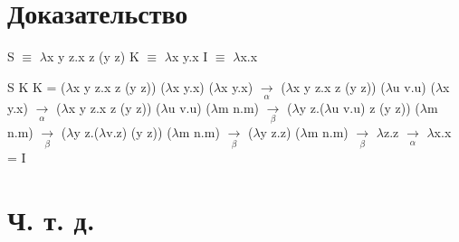 \documentclass[a4paper,14pt]{article}
\begin{document}
\fontsize{14}{7pt}\selectfont
{} 
\bigskip
\section*{Доказательство}
S $\equiv$ $\lambda$x y z.x z (y z) \newline
K $\equiv$ $\lambda$x y.x \newline
I $\equiv$ $\lambda$x.x \newline
\bigskip

S K K = ($\lambda$x y z.x z (y z)) ($\lambda$x y.x) ($\lambda$x y.x)
        $\xrightarrow[\alpha]{}$ \newline
        ($\lambda$x y z.x z (y z)) ($\lambda$u v.u) ($\lambda$x y.x) 
        $\xrightarrow[\alpha]{}$ \newline
        ($\lambda$x y z.x z (y z)) ($\lambda$u v.u) ($\lambda$m n.m) 
        $\xrightarrow[\beta]{}$ \newline
        ($\lambda$y z.($\lambda$u v.u) z (y z)) ($\lambda$m n.m) 
        $\xrightarrow[\beta]{}$ \newline
        ($\lambda$y z.($\lambda$v.z) (y z)) ($\lambda$m n.m) 
        $\xrightarrow[\beta]{}$ \newline
        ($\lambda$y z.z) ($\lambda$m n.m) 
        $\xrightarrow[\beta]{}$ \newline
        $\lambda$z.z 
        $\xrightarrow[\alpha]{}$ \newline
        $\lambda$x.x = I
        
\bigskip
\section*{Ч. т. д.}
        
\end{document}
